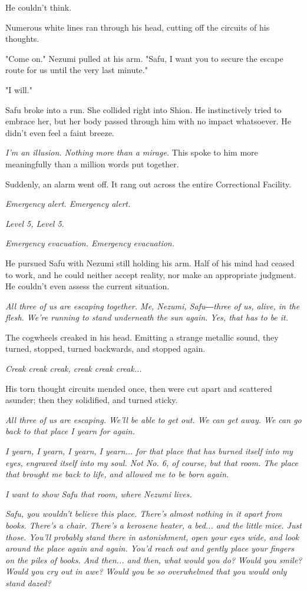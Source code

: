 He couldn't think.

Numerous white lines ran through his head, cutting off the circuits of
his thoughts.

"Come on." Nezumi pulled at his arm. "Safu, I want you to secure the
escape route for us until the very last minute."

"I will."

Safu broke into a run. She collided right into Shion. He instinctively
tried to embrace her, but her body passed through him with no impact
whatsoever. He didn't even feel a faint breeze.

\emph{I'm an illusion. Nothing more than a mirage.} This spoke to him more
meaningfully than a million words put together.

Suddenly, an alarm went off. It rang out across the entire Correctional
Facility.

\emph{Emergency alert. Emergency alert.}

\emph{Level 5, Level 5.}

\emph{Emergency evacuation. Emergency evacuation.}

He pursued Safu with Nezumi still holding his arm. Half of his mind had
ceased to work, and he could neither accept reality, nor make an
appropriate judgment. He couldn't even assess the current situation.

\emph{All three of us are escaping together. Me, Nezumi, Safu―three of us,
	alive, in the flesh. We're running to stand underneath the sun again.
	Yes, that has to be it.}

The cogwheels creaked in his head. Emitting a strange metallic sound,
they turned, stopped, turned backwards, and stopped again.

\emph{Creak creak creak, creak creak creak...}

His torn thought circuits mended once, then were cut apart and scattered
asunder; then they solidified, and turned sticky.

\emph{All three of us are escaping. We'll be able to get out. We can get away.
	We can go back to that place I yearn for again.}

\emph{I yearn, I yearn, I yearn, I yearn... for that place that has burned
	itself into my eyes, engraved itself into my soul. Not No. 6, of course,
	but that room. The place that brought me back to life, and allowed me to
	be born again.}

\emph{I want to show Safu that room, where Nezumi lives.}

\emph{Safu, you wouldn't believe this place. There's almost nothing in it
	apart from books. There's a chair. There's a kerosene heater, a bed...
	and the little mice. Just those. You'll probably stand there in
	astonishment, open your eyes wide, and look around the place again and
	again. You'd reach out and gently place your fingers on the piles of
	books. And then... and then, what would you do? Would you smile? Would
	you cry out in awe? Would you be so overwhelmed that you would only
	stand dazed?}

